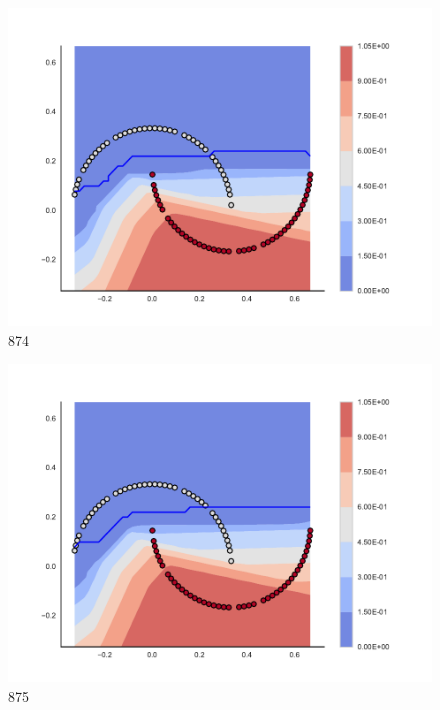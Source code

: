 \begin{subfigure}[b]{0.09\textwidth}
    \includegraphics[clip, trim=2.35cm 1.75cm 4.5cm 0cm,width=\textwidth]{img/convergence/874.pdf}
    \caption{874}
    \label{fig:convergence_874}
\end{subfigure}
%
\begin{subfigure}[b]{0.09\textwidth}
    \includegraphics[clip, trim=2.35cm 1.75cm 4.5cm 0cm,width=\textwidth]{img/convergence/875.pdf}
    \caption{875}
    \label{fig:convergence_875}
\end{subfigure}
%
